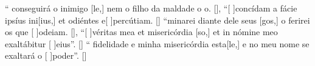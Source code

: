 {    {`` conseguirá o inimigo [le,] nem o filho da maldade o o. [\LinkPT]},
  {``[ ]{con}cídam a fácie ipsíus ini[ius,] et odiéntes e[ ]{per}{cú}tiam. [\LinkLA]}%
    {``minarei diante dele seus [gos,] o ferirei os que [ ]{o}{dei}am. [\LinkPT]},
  {``[ ]{vé}ritas mea et misericórdia [so,] et in nómine meo exaltábitur [ ]{e}ius''. [\LinkLA]}%
    {`` fidelidade e minha misericórdia esta[le,] e no meu nome se exaltará o [ ]{po}{der}''. [\LinkPT]}
}
